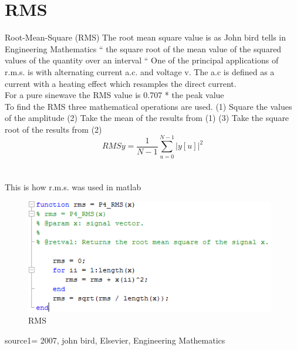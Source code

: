 \section{RMS}
Root-Mean-Square (RMS)
The root mean square value is as John bird tells in Engineering Mathematics \cite{Bird2007
} “ the square root of the mean value of the squared values of the quantity over an interval “
One of the principal applications of r.m.s. is with alternating current a.c. and voltage v. The a.c is defined as a current with a heating effect which resamples the direct current. \cite{Bird2007}
\\
For a pure sinewave the RMS value is 0.707 * the peak value
\\
To find the RMS three mathematical operations are used.
(1)	Square the values of the amplitude
(2)	Take the mean of the results from (1)
(3)	Take the square root of the results from (2)
\begin{equation}\label{eq:RMS formular}
RMSy = \frac{1}{N-1}\sum_{u=0}^{N-1}|y[u]|^2
\end{equation}
\\

\\
This is how r.m.s. was used in matlab
\begin{figure}
\begin{center}
\includegraphics[height=5cm]{fig/RMS_matlabCode.png}
\caption{RMS}
\end{center}
\end{figure}

source1= 2007, john bird, Elsevier, Engineering Mathematics